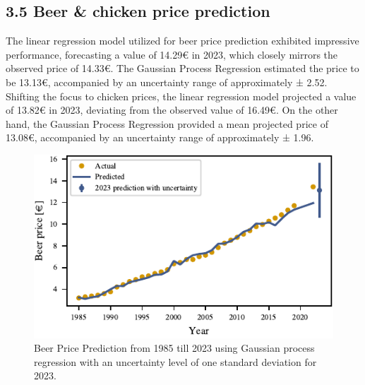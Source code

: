 \documentclass{article}
\theoremstyle{plain}
\theoremstyle{definition}
\theoremstyle{remark}
\begin{document}
\subsection*{3.5 Beer \& chicken price prediction}
The linear regression model utilized for beer price prediction exhibited impressive performance, forecasting a value of 14.29€ in 2023, which closely mirrors the observed price of 14.33€. The Gaussian Process Regression estimated the price to be 13.13€, accompanied by an uncertainty range of approximately ± 2.52.
Shifting the focus to chicken prices, the linear regression model projected a value of 13.82€ in 2023, deviating from the observed value of 16.49€. On the other hand, the Gaussian Process Regression provided a mean projected price of 13.08€, accompanied by an uncertainty range of approximately ± 1.96.
\begin{figure}[ht]
    \includegraphics{fig/gaussian_beer_price_pred.pdf}
    \caption{Beer Price Prediction from 1985 till 2023 using Gaussian process regression with an uncertainty level of one standard deviation for 2023.  }
    \label{figure_prediction}
\end{figure}
\end{document}
